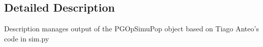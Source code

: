 \subsection{Detailed Description}
\begin{DoxyVerb}Description
manages output of the PGOpSimuPop object
based on Tiago Anteo's code in sim.py
\end{DoxyVerb}
 